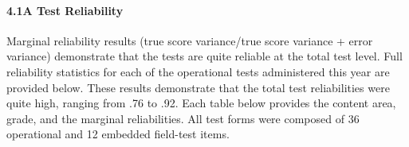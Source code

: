 \documentclass[]{article}
\let\oldparagraph\paragraph
\renewcommand{\paragraph}[1]{\oldparagraph{#1}\mbox{}}
\begin{document}
\hypertarget{a-test-reliability}{%
\paragraph{4.1A Test Reliability}\label{a-test-reliability}}

Marginal reliability results (true score variance/true score variance +
error variance) demonstrate that the tests are quite reliable at the
total test level. Full reliability statistics for each of the
operational tests administered this year are provided below. These
results demonstrate that the total test reliabilities were quite high,
ranging from .76 to .92. Each table below provides the content area,
grade, and the marginal reliabilities. All test forms were composed of
36 operational and 12 embedded field-test items.
\end{document}
